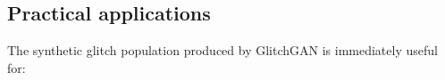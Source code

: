 \documentclass[reprint,nofootinbib,amsmath,amssymb,aps,floatfix]{revtex4-2}
\begin{document}







\subsection{Practical applications}

The synthetic glitch population produced by GlitchGAN is immediately useful for:
\end{document}

